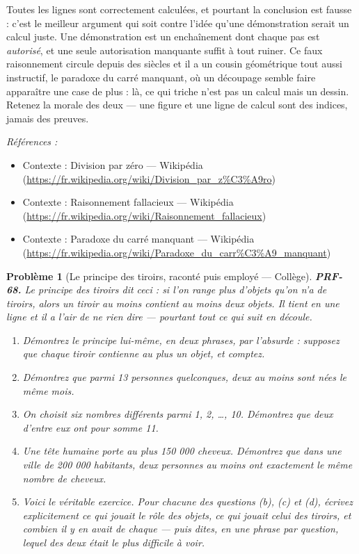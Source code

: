 \documentclass[11pt]{article}
\newtheorem{problem}{Problème}
\newenvironment{refs}{\par\small\noindent\emph{Références :}\begin{itemize}\setlength\itemsep{0pt}}{\end{itemize}\normalsize}
\begin{document}
\noindent Toutes les lignes sont correctement calculées, et pourtant la conclusion
est fausse : c'est le meilleur argument qui soit contre l'idée qu'une démonstration serait
un calcul juste. Une démonstration est un enchaînement dont chaque pas est \textit{autorisé},
et une seule autorisation manquante suffit à tout ruiner. Ce faux raisonnement circule
depuis des siècles et il a un cousin géométrique tout aussi instructif, le paradoxe du carré
manquant, où un découpage semble faire apparaître une case de plus : là, ce qui triche n'est
pas un calcul mais un dessin. Retenez la morale des deux --- une figure et une ligne de calcul
sont des indices, jamais des preuves.

\begin{refs}
\item Contexte : Division par zéro --- Wikipédia (\url{https://fr.wikipedia.org/wiki/Division_par_z%C3%A9ro})
\item Contexte : Raisonnement fallacieux --- Wikipédia (\url{https://fr.wikipedia.org/wiki/Raisonnement_fallacieux})
\item Contexte : Paradoxe du carré manquant --- Wikipédia (\url{https://fr.wikipedia.org/wiki/Paradoxe_du_carr%C3%A9_manquant})
\end{refs}

\bigskip

\begin{problem}[{Le principe des tiroirs, raconté puis employé --- Collège}]
\textbf{PRF-68.} Le principe des tiroirs dit ceci : si l'on range plus d'objets qu'on n'a
de tiroirs, alors un tiroir au moins contient au moins deux objets. Il tient en une ligne et
il a l'air de ne rien dire --- pourtant tout ce qui suit en découle.
\begin{enumerate}
\item[(a)] Démontrez le principe lui-même, en deux phrases, par l'absurde : supposez que chaque
tiroir contienne au plus un objet, et comptez.
\item[(b)] Démontrez que parmi 13 personnes quelconques, deux au moins sont nées le même mois.
\item[(c)] On choisit six nombres différents parmi 1, 2, \dots{}, 10. Démontrez que deux d'entre eux ont
pour somme 11.
\item[(d)] Une tête humaine porte au plus 150 000 cheveux. Démontrez que dans une ville de
200 000 habitants, deux personnes au moins ont exactement le même nombre de cheveux.
\item[(e)] Voici le véritable exercice. Pour chacune des questions (b), (c) et (d), écrivez
explicitement ce qui jouait le rôle des objets, ce qui jouait celui des tiroirs, et combien
il y en avait de chaque --- puis dites, en une phrase par question, lequel des deux était le
plus difficile à voir.
\end{enumerate}

\end{problem}
\end{document}
